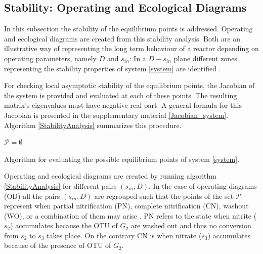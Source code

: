 \documentclass[processes,article,submit,moreauthors,pdftex]{Definitions/mdpi}
\newcommand{\N}{\mathbb{N}}
\newcommand{\R}{\mathbb{R}}
\begin{document}
\subsection{Stability: Operating and Ecological Diagrams}

In this subsection the stability of the equilibrium points is addressed. Operating and ecological diagrams are created from this stability analysis. Both are an illustrative way of representing the long term behaviour of a reactor depending on operating parameters, namely $D$ and $s_{in}$: In a $D-s_{in}$ plane different zones representing the stability properties of system \eqref{system} are identified \cite{Pavlou1999}. 

For checking local asymptotic stability of the equilibrium points, the Jacobian of the system is provided and evaluated at each of these points. The resulting matrix's eigenvalues must have negative real part. A general formula for this Jacobian is presented in the supplementary material \eqref{Jacobian_system}. Algorithm \ref{StabilityAnalysis} summarizes this procedure.

\begin{algorithm}[H]
	\KwData{$A \in M_{n\times n}(\R)$, $D, s_{in}, \bar{\mu}_i,K_i, k_i,  \in \R \, i\in [n], $, $n_1, n_2 \in \N$}
	$\mathcal{P} = \emptyset$ \\
	\label{StabilityAnalysis}
	\caption{Algorithm for evaluating the possible equilibrium points of system \eqref{system}.}
\end{algorithm}


Operating and ecological diagrams are created by running algorithm \ref{StabilityAnalysis} for different pairs $(s_{in},D)$. In the case of operating diagrams \cite{lobry2017chemostat} (OD) all the pairs $(s_{in},D)$ are regrouped such that the points of the set $\mathcal{P}$ represent when partial nitrification (PN), complete nitrification (CN), washout (WO), or a combination of them may arise \cite{KHIN2004519}. PN refers to the state when nitrite ($s_2$) accumulates because the OTU of $G_2$ are washed out and thus no conversion from $s_2$  to $s_3$ takes place. On the contrary CN is when nitrate ($s_3$) accumulates because of the presence of OTU of $G_2$. 
\end{document}
